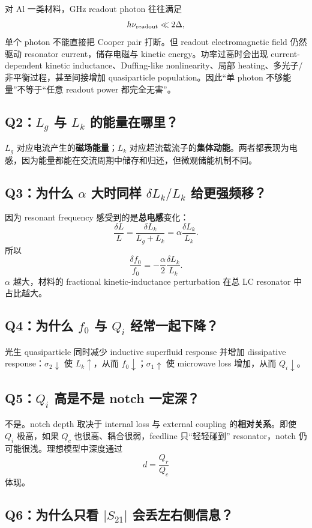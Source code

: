 \documentclass[11pt,a4paper,openany]{ctexrep}
\begin{document}
对 Al 一类材料，GHz readout photon 往往满足
\[
h\nu_{\rm readout}\ll2\Delta,
\]
单个 photon 不能直接把 Cooper pair 打断。但 readout electromagnetic field 仍然驱动 resonator current，储存电磁与 kinetic energy。功率过高时会出现 current-dependent kinetic inductance、Duffing-like nonlinearity、局部 heating、多光子/非平衡过程，甚至间接增加 quasiparticle population。因此“单 photon 不够能量”不等于“任意 readout power 都完全无害”。

\subsection*{Q2：$L_g$ 与 $L_k$ 的能量在哪里？}

$L_g$ 对应电流产生的\textbf{磁场能量}；$L_k$ 对应超流载流子的\textbf{集体动能}。两者都表现为电感，因为能量都能在交流周期中储存和归还，但微观储能机制不同。

\subsection*{Q3：为什么 $\alpha$ 大时同样 $\delta L_k/L_k$ 给更强频移？}

因为 resonant frequency 感受到的是\textbf{总电感}变化：
\[
\frac{\delta L}{L}
=\frac{\delta L_k}{L_g+L_k}
=\alpha\frac{\delta L_k}{L_k}.
\]
所以
\[
\frac{\delta f_0}{f_0}
=-\frac{\alpha}{2}\frac{\delta L_k}{L_k}.
\]
$\alpha$ 越大，材料的 fractional kinetic-inductance perturbation 在总 LC resonator 中占比越大。

\subsection*{Q4：为什么 $f_0$ 与 $Q_i$ 经常一起下降？}

光生 quasiparticle 同时减少 inductive superfluid response 并增加 dissipative response：$\sigma_2\downarrow$ 使 $L_k\uparrow$，从而 $f_0\downarrow$；$\sigma_1\uparrow$ 使 microwave loss 增加，从而 $Q_i\downarrow$。

\subsection*{Q5：$Q_i$ 高是不是 notch 一定深？}

不是。notch depth 取决于 internal loss 与 external coupling 的\textbf{相对关系}。即使 $Q_i$ 极高，如果 $Q_c$ 也很高、耦合很弱，feedline 只“轻轻碰到” resonator，notch 仍可能很浅。理想模型中深度通过
\[
d=\frac{Q_r}{Q_c}
\]
体现。

\subsection*{Q6：为什么只看 $|S_{21}|$ 会丢左右侧信息？}
\end{document}
